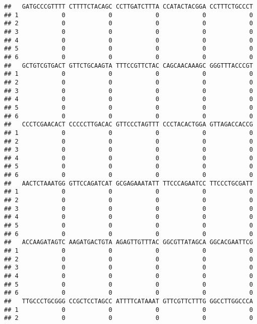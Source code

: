 \documentclass[]{article}
\begin{document}
\begin{verbatim}
##   GATGCCCGTTTT CTTTTCTACAGC CCTTGATCTTTA CCATACTACGGA CCTTTCTGCCCT
## 1            0            0            0            0            0
## 2            0            0            0            0            0
## 3            0            0            0            0            0
## 4            0            0            0            0            0
## 5            0            0            0            0            0
## 6            0            0            0            0            0
##   GCTGTCGTGACT GTTCTGCAAGTA TTTCCGTTCTAC CAGCAACAAAGC GGGTTTACCCGT
## 1            0            0            0            0            0
## 2            0            0            0            0            0
## 3            0            0            0            0            0
## 4            0            0            0            0            0
## 5            0            0            0            0            0
## 6            0            0            0            0            0
##   CCCTCGAACACT CCCCCTTGACAC GTTCCCTAGTTT CCCTACACTGGA GTTAGACCACCG
## 1            0            0            0            0            0
## 2            0            0            0            0            0
## 3            0            0            0            0            0
## 4            0            0            0            0            0
## 5            0            0            0            0            0
## 6            0            0            0            0            0
##   AACTCTAAATGG GTTCCAGATCAT GCGAGAAATATT TTCCCAGAATCC TTCCCTGCGATT
## 1            0            0            0            0            0
## 2            0            0            0            0            0
## 3            0            0            0            0            0
## 4            0            0            0            0            0
## 5            0            0            0            0            0
## 6            0            0            0            0            0
##   ACCAAGATAGTC AAGATGACTGTA AGAGTTGTTTAC GGCGTTATAGCA GGCACGAATTCG
## 1            0            0            0            0            0
## 2            0            0            0            0            0
## 3            0            0            0            0            0
## 4            0            0            0            0            0
## 5            0            0            0            0            0
## 6            0            0            0            0            0
##   TTGCCCTGCGGG CCGCTCCTAGCC ATTTTCATAAAT GTTCGTTCTTTG GGCCTTGGCCCA
## 1            0            0            0            0            0
## 2            0            0            0            0            0

\end{verbatim}
\end{document}
